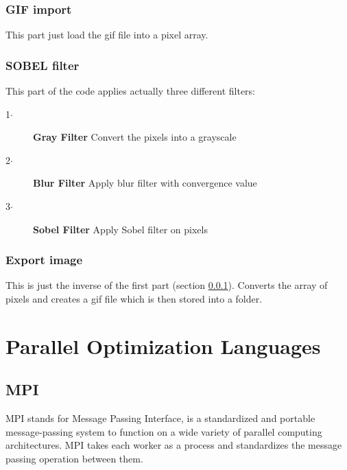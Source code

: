 \documentclass[conference,compsoc]{IEEEtran}
\begin{document}
\subsubsection{GIF import}\label{sec:GIF-import}
This part just load the gif file into a pixel array. 

\subsubsection{SOBEL filter}\label{sec:SOBEL-filter}
This part of the code applies actually three different filters:
\begin{description}
	\item[1$\cdot$] \textbf{Gray Filter} Convert the pixels into a grayscale
	\item[2$\cdot$] \textbf{Blur Filter} Apply blur filter with convergence value
	\item[3$\cdot$] \textbf{Sobel Filter} Apply Sobel filter on pixels
\end{description}

\subsubsection{Export image}\label{sec:Export-image}
This is just the inverse of the first part (section \ref{sec:GIF-import}). Converts the array of pixels and creates a gif file which is then stored into a folder.

\section{Parallel Optimization Languages}
\subsection{MPI} \label{sec:MPI}
MPI stands for Message Passing Interface, is a standardized and portable message-passing system to function on a wide variety of parallel computing architectures. MPI takes each worker as a process and standardizes the message passing operation between them.
\end{document}
